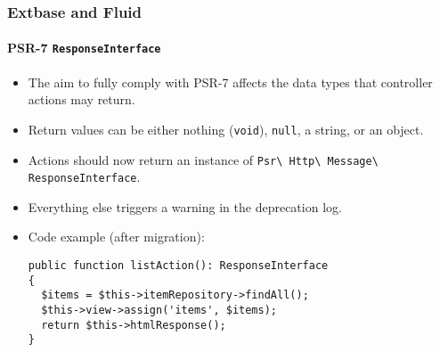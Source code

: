 %

\begin{frame}[fragile]
	\frametitle{Extbase and Fluid}
	\framesubtitle{PSR-7 \texttt{ResponseInterface}}


	\begin{itemize}
		\item The aim to fully comply with PSR-7 affects the data types that
			controller actions may return.
		\item Return values can be either nothing (\small\texttt{void}\normalsize),
			\small\texttt{null}\normalsize, a string, or an object.
		\item Actions should now return an instance of
			\small\texttt{Psr\textbackslash
				Http\textbackslash
				Message\textbackslash
				ResponseInterface}.\normalsize
		\item Everything else triggers a warning in the deprecation log.
		\item Code example (after migration):
\begin{lstlisting}
public function listAction(): ResponseInterface
{
  $items = $this->itemRepository->findAll();
  $this->view->assign('items', $items);
  return $this->htmlResponse();
}
\end{lstlisting}

	\end{itemize}

\end{frame}

